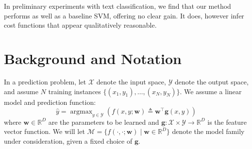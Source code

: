 \documentclass{article} %
\DeclareMathOperator*{\argmax}{argmax}
\newcommand{\bmcomment}[1]{\textcolor{blue}{\textsc{\textbf{[#1 --bm]}}}}
\begin{document}
In preliminary experiments with text classification, we find that our
method performs as well as a baseline SVM, offering no clear gain.  It
does, however infer cost functions that appear qualitatively
reasonable.




%

\section{Background and Notation}

In a prediction problem, let $\mathcal{X}$ denote the input space,
$\mathcal{Y}$ denote the output space, and assume $N$ training
instances $\{(x_1, y_1), \ldots, (x_N, y_N)\}$.  We assume a linear
model and prediction function:
\begin{equation}
\hat{y} = \argmax_{y \in \mathcal{Y}} \left(f(x, y;\mathbf{w}) \triangleq \mathbf{w}^\top \mathbf{g}(x, y) \right)
\end{equation}
where $\mathbf{w} \in \mathbb{R}^D$ are the parameters to be learned
and $\mathbf{g} : \mathcal{X} \times \mathcal{Y} \rightarrow
\mathbb{R}^D$ is the feature vector function.  We will let
$\mathcal{M} =\{f(\cdot,\cdot;\mathbf{w}) \mid \mathbf{w} \in
\mathbb{R}^D\}$ denote the model family under consideration, given a
fixed choice of $\mathbf{g}$.
\end{document}
